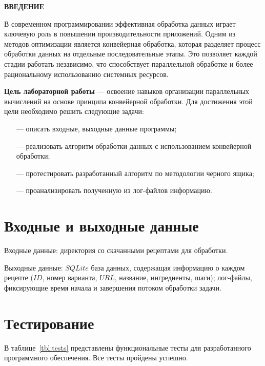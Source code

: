 \begin{center}
    \textbf{ВВЕДЕНИЕ}
\end{center}

В современном программировании эффективная обработка данных играет ключевую роль в повышении производительности приложений. Одним из методов оптимизации является конвейерная обработка, которая разделяет процесс обработки данных на отдельные последовательные этапы. Это позволяет каждой стадии работать независимо, что способствует параллельной обработке и более рациональному использованию системных ресурсов.

\textbf{Цель лабораторной работы} --- освоение навыков организации параллельных вычислений на основе принципа конвейерной обработки. Для достижения этой цели необходимо решить следующие задачи:

\begin{itemize}
	\item[---] описать входные, выходные данные программы;
	\item[---] реализовать алгоритм обработки данных с использованием конвейерной обработки;
	\item[---] протестировать разработанный алгоритм по методологии черного ящика;
        \item[---] проанализировать полученную из лог-файлов информацию.
\end{itemize}


\chapter{Входные и выходные данные}

Входные данные: директория со скачанными рецептами для обработки.

Выходные данные: $SQLite$ база данных, содержащая информацию о каждом рецепте ($ID$, номер варианта, $URL$, название, ингредиенты, шаги); лог-файлы, фиксирующие время начала и завершения потоком обработки задачи.

\chapter{Тестирование}
В таблице~\ref{tbl:tests} представлены функциональные тесты для разработанного
программного обеспечения. Все тесты пройдены успешно.

